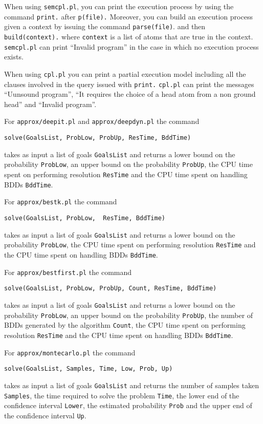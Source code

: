 \documentclass[a4paper,10pt]{scrartcl}
\begin{document}
When using \texttt{semcpl.pl}, you can print the execution process by using the command \texttt{print.}
after \texttt{p(file).} Moreover, you can build an execution process given a context by issuing the command \texttt{parse(file)}. and then
\texttt{build(context).} where \texttt{context} is a list of atoms that are true in the context.
\texttt{semcpl.pl}  can print ``Invalid program'' in the case in which no execution process exists. 

When using \texttt{cpl.pl} you can print a partial execution model including all the clauses involved in the query issued with \texttt{print.} \texttt{cpl.pl} can print the messages ``Uunsound program'', ``It requires the choice of a head atom from a non ground head'' and ``Invalid program''.

For \texttt{approx/deepit.pl} and \texttt{approx/deepdyn.pl} the command 
\begin{verbatim}
solve(GoalsList, ProbLow, ProbUp, ResTime, BddTime)
\end{verbatim}
takes as input a list of goals \texttt{GoalsList} and returns a lower bound on the probability \texttt{ProbLow}, an upper bound on the probability \texttt{ProbUp}, the CPU time spent on performing resolution \texttt{ResTime} and the CPU time spent on handling BDDs \texttt{BddTime}.

For \texttt{approx/bestk.pl} the command 
\begin{verbatim}
solve(GoalsList, ProbLow,  ResTime, BddTime)
\end{verbatim}
takes as input a list of goals \texttt{GoalsList} and returns a lower bound on the probability \texttt{ProbLow}, the CPU time spent on performing resolution \texttt{ResTime} and the CPU time spent on handling BDDs \texttt{BddTime}.

For \texttt{approx/bestfirst.pl}  the command 
\begin{verbatim}
solve(GoalsList, ProbLow, ProbUp, Count, ResTime, BddTime)
\end{verbatim}
takes as input a list of goals \texttt{GoalsList} and returns a lower bound on the probability \texttt{ProbLow}, an upper bound on the probability \texttt{ProbUp}, the number of BDDs generated by the algorithm \texttt{Count}, the CPU time spent on performing resolution \texttt{ResTime} and the CPU time spent on handling BDDs \texttt{BddTime}.


For \texttt{approx/montecarlo.pl} 
the command 
\begin{verbatim}
solve(GoalsList, Samples, Time, Low, Prob, Up)
\end{verbatim}
takes as input a list of goals \texttt{GoalsList} and returns the number of samples taken \texttt{Samples}, 
the time required to solve the problem \texttt{Time}, the
lower end of the confidence interval \texttt{Lower}, the estimated probability \texttt{Prob} and the upper end of the confidence interval \texttt{Up}.
\end{document}
